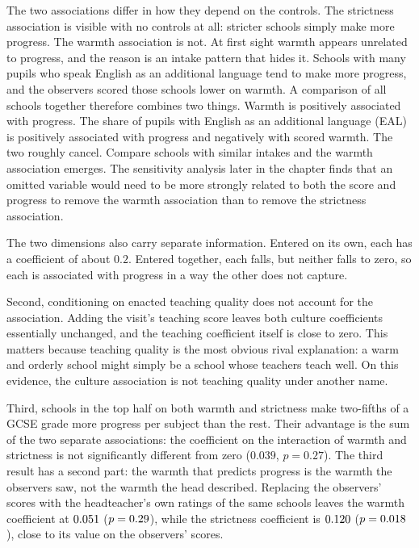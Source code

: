 The two associations differ in how they depend on the controls. The strictness association is visible with no controls at all: stricter schools simply make more progress. The warmth association is not. At first sight warmth appears unrelated to progress, and the reason is an intake pattern that hides it. Schools with many pupils who speak English as an additional language tend to make more progress, and the observers scored those schools lower on warmth. A comparison of all schools together therefore combines two things. Warmth is positively associated with progress. The share of pupils with English as an additional language (EAL) is positively associated with progress and negatively with scored warmth. The two roughly cancel. Compare schools with similar intakes and the warmth association emerges. The sensitivity analysis later in the chapter finds that an omitted variable would need to be more strongly related to both the score and progress to remove the warmth association than to remove the strictness association.

The two dimensions also carry separate information. Entered on its own, each has a coefficient of about $0.2$. Entered together, each falls, but neither falls to zero, so each is associated with progress in a way the other does not capture.

Second, conditioning on enacted teaching quality does not account for the association. Adding the visit's teaching score leaves both culture coefficients essentially unchanged, and the teaching coefficient itself is close to zero. This matters because teaching quality is the most obvious rival explanation: a warm and orderly school might simply be a school whose teachers teach well. On this evidence, the culture association is not teaching quality under another name.

Third, schools in the top half on both warmth and strictness make two-fifths of a GCSE grade more progress per subject than the rest. Their advantage is the sum of the two separate associations: the coefficient on the interaction of warmth and strictness is not significantly different from zero ($0.039$, $p = 0.27$). The third result has a second part: the warmth that predicts progress is the warmth the observers saw, not the warmth the head described. Replacing the observers' scores with the headteacher's own ratings of the same schools leaves the warmth coefficient at $0.051$ ($p = 0.29$), while the strictness coefficient is $0.120$ ($p = 0.018$), close to its value on the observers' scores.

